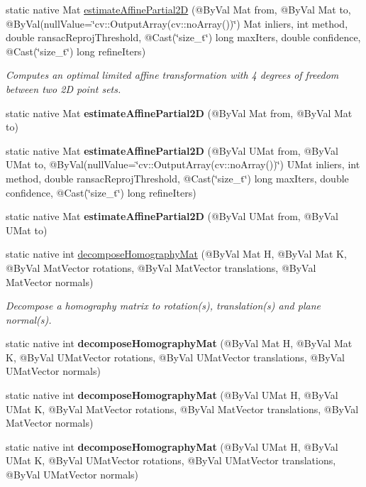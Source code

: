 \begin{DoxyCompactItemize}
\item 
static native Mat \hyperlink{group__calib3d_gab4e1d79cab0ae6448de411f9688836c8}{estimate\+Affine\+Partial2D} (@By\+Val Mat from, @By\+Val Mat to, @By\+Val(null\+Value=\char`\"{}cv\+::\+Output\+Array(cv\+::no\+Array())\char`\"{}) Mat inliers, int method, double ransac\+Reproj\+Threshold, @Cast(\char`\"{}size\+\_\+t\char`\"{}) long max\+Iters, double confidence, @Cast(\char`\"{}size\+\_\+t\char`\"{}) long refine\+Iters)
\begin{DoxyCompactList}\small\item\em Computes an optimal limited affine transformation with 4 degrees of freedom between two 2D point sets. \end{DoxyCompactList}\item 
static native Mat {\bfseries estimate\+Affine\+Partial2D} (@By\+Val Mat from, @By\+Val Mat to)
\item 
static native Mat {\bfseries estimate\+Affine\+Partial2D} (@By\+Val U\+Mat from, @By\+Val U\+Mat to, @By\+Val(null\+Value=\char`\"{}cv\+::\+Output\+Array(cv\+::no\+Array())\char`\"{}) U\+Mat inliers, int method, double ransac\+Reproj\+Threshold, @Cast(\char`\"{}size\+\_\+t\char`\"{}) long max\+Iters, double confidence, @Cast(\char`\"{}size\+\_\+t\char`\"{}) long refine\+Iters)
\item 
static native Mat {\bfseries estimate\+Affine\+Partial2D} (@By\+Val U\+Mat from, @By\+Val U\+Mat to)
\item 
static native int \hyperlink{group__calib3d_gac6a35d2f8ad957af40b439f4b0a6aad6}{decompose\+Homography\+Mat} (@By\+Val Mat H, @By\+Val Mat K, @By\+Val Mat\+Vector rotations, @By\+Val Mat\+Vector translations, @By\+Val Mat\+Vector normals)
\begin{DoxyCompactList}\small\item\em Decompose a homography matrix to rotation(s), translation(s) and plane normal(s). \end{DoxyCompactList}\item 
static native int {\bfseries decompose\+Homography\+Mat} (@By\+Val Mat H, @By\+Val Mat K, @By\+Val U\+Mat\+Vector rotations, @By\+Val U\+Mat\+Vector translations, @By\+Val U\+Mat\+Vector normals)
\item 
static native int {\bfseries decompose\+Homography\+Mat} (@By\+Val U\+Mat H, @By\+Val U\+Mat K, @By\+Val Mat\+Vector rotations, @By\+Val Mat\+Vector translations, @By\+Val Mat\+Vector normals)
\item 
static native int {\bfseries decompose\+Homography\+Mat} (@By\+Val U\+Mat H, @By\+Val U\+Mat K, @By\+Val U\+Mat\+Vector rotations, @By\+Val U\+Mat\+Vector translations, @By\+Val U\+Mat\+Vector normals)

\end{DoxyCompactItemize}

